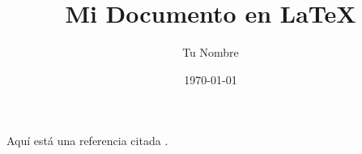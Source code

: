 \documentclass{article}
\title{Mi Documento en LaTeX}
\author{Tu Nombre}
\date{\today}
\begin{document}
\maketitle

Aquí está una referencia citada \cite{Guo_CategoryTheory}.

\printbibliography %
\end{document}
